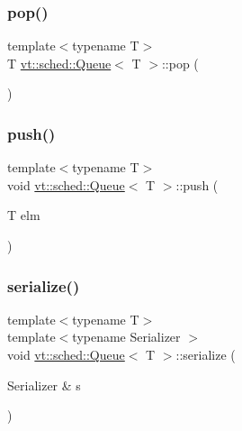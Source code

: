 \mbox{\label{structvt_1_1sched_1_1_queue_ad5e435489eb04cd78a2da6acfa855331}} 
\subsubsection{\texorpdfstring{pop()}{pop()}}
{\footnotesize\ttfamily template$<$typename T$>$ \\
T \hyperlink{structvt_1_1sched_1_1_queue}{vt\+::sched\+::\+Queue}$<$ T $>$\+::pop (\begin{DoxyParamCaption}{ }\end{DoxyParamCaption})\hspace{0.3cm}{\ttfamily [inline]}}

\mbox{\label{structvt_1_1sched_1_1_queue_a5079f0b8b665ec528767a12ab210d1be}} 
\subsubsection{\texorpdfstring{push()}{push()}}
{\footnotesize\ttfamily template$<$typename T$>$ \\
void \hyperlink{structvt_1_1sched_1_1_queue}{vt\+::sched\+::\+Queue}$<$ T $>$\+::push (\begin{DoxyParamCaption}\item[{T}]{elm }\end{DoxyParamCaption})\hspace{0.3cm}{\ttfamily [inline]}}

\mbox{\label{structvt_1_1sched_1_1_queue_aaa65b12c2cd3aca57fc59a1d5db25792}} 
\subsubsection{\texorpdfstring{serialize()}{serialize()}}
{\footnotesize\ttfamily template$<$typename T$>$ \\
template$<$typename Serializer $>$ \\
void \hyperlink{structvt_1_1sched_1_1_queue}{vt\+::sched\+::\+Queue}$<$ T $>$\+::serialize (\begin{DoxyParamCaption}\item[{Serializer \&}]{s }\end{DoxyParamCaption})\hspace{0.3cm}{\ttfamily [inline]}}

